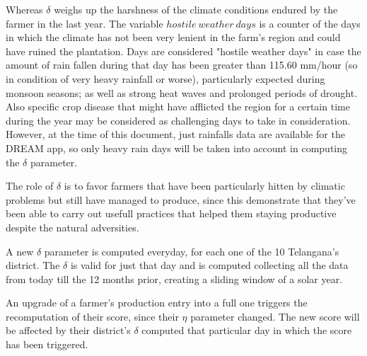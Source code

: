 \documentclass[table, 12pt]{article}
\begin{document}

Whereas $\delta$ weighs up the harshness of the climate conditions endured by the farmer in the last year. The variable $hostile\ weather\ days$ is a counter of the days in which the climate has not been very lenient in the farm's region and could have ruined the plantation. Days are considered "hostile weather days" in case the amount of rain fallen during that day has been greater than 115.60 mm/hour (so in condition of very heavy rainfall or worse)\cite{rainfallsData}, particularly expected during monsoon seasons; as well as strong heat waves and prolonged periods of drought. Also specific crop disease that might have afflicted the region for a certain time during the year may be considered as challenging days to take in consideration. However, at the time of this document, just rainfalls data are available for the DREAM app, so only heavy rain days will be taken into account in computing the $\delta$ parameter.

The role of $\delta$ is to favor farmers that have been particularly hitten by climatic problems but still have managed to produce, since this demonstrate that they've been able to carry out usefull practices that helped them staying productive despite the natural adversities. 

A new $\delta$ parameter is computed everyday, for each one of the 10 Telangana's district. The $\delta$ is valid for just that day and is computed collecting all the data from today till the 12 months prior, creating a sliding window of a solar year. 

An upgrade of a farmer's production entry into a full one triggers the recomputation of their score, since their $\eta$ parameter changed. The new score will be affected by their district's $\delta$ computed that particular day in which the score has been triggered.
\end{document}
